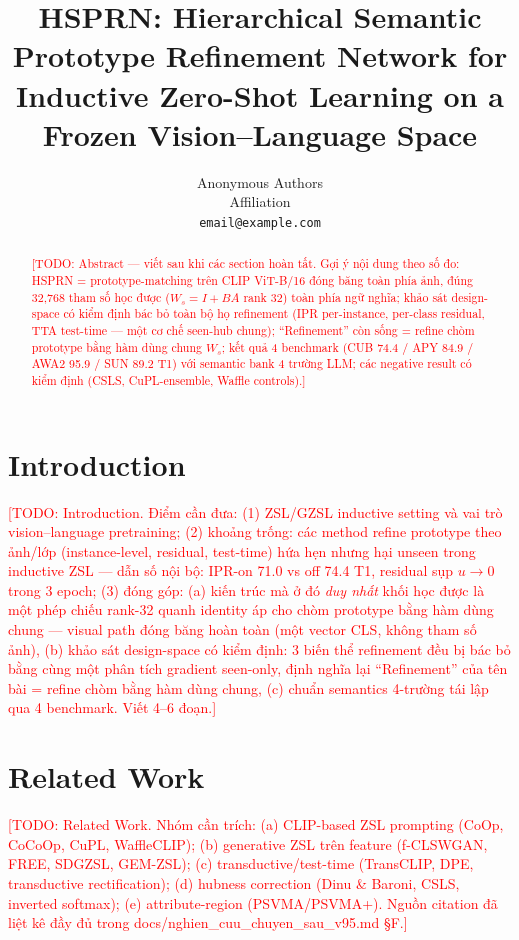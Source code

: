 \documentclass[10pt,twocolumn,letterpaper]{article}
\title{HSPRN: Hierarchical Semantic Prototype Refinement Network for\\
Inductive Zero-Shot Learning on a Frozen Vision--Language Space}
\author{
  Anonymous Authors\\
  \small Affiliation\\
  \small \texttt{email@example.com}
}
\date{}
\newcommand{\todo}[1]{\textcolor{red}{[TODO: #1]}}
\begin{document}
\maketitle

\begin{abstract}
\todo{Abstract — viết sau khi các section hoàn tất. Gợi ý nội dung theo số đo: HSPRN = prototype-matching trên CLIP ViT-B/16 đóng băng toàn phía ảnh, đúng 32{,}768 tham số học được ($W_s{=}I{+}BA$ rank 32) toàn phía ngữ nghĩa; khảo sát design-space có kiểm định bác bỏ toàn bộ họ refinement (IPR per-instance, per-class residual, TTA test-time — một cơ chế seen-hub chung); ``Refinement'' còn sống = refine chòm prototype bằng hàm dùng chung $W_s$; kết quả 4 benchmark (CUB 74.4 / APY 84.9 / AWA2 95.9 / SUN 89.2 T1) với semantic bank 4 trường LLM; các negative result có kiểm định (CSLS, CuPL-ensemble, Waffle controls).}
\end{abstract}

\section{Introduction}
\todo{Introduction. Điểm cần đưa: (1) ZSL/GZSL inductive setting và vai trò vision--language pretraining; (2) khoảng trống: các method refine prototype theo ảnh/lớp (instance-level, residual, test-time) hứa hẹn nhưng hại unseen trong inductive ZSL — dẫn số nội bộ: IPR-on 71.0 vs off 74.4 T1, residual sụp $u \to 0$ trong 3 epoch; (3) đóng góp: (a) kiến trúc mà ở đó \emph{duy nhất} khối học được là một phép chiếu rank-32 quanh identity áp cho chòm prototype bằng hàm dùng chung — visual path đóng băng hoàn toàn (một vector CLS, không tham số ảnh), (b) khảo sát design-space có kiểm định: 3 biến thể refinement đều bị bác bỏ bằng cùng một phân tích gradient seen-only, định nghĩa lại ``Refinement'' của tên bài = refine chòm bằng hàm dùng chung, (c) chuẩn semantics 4-trường tái lập qua 4 benchmark. Viết 4--6 đoạn.}

\section{Related Work}
\todo{Related Work. Nhóm cần trích: (a) CLIP-based ZSL prompting (CoOp, CoCoOp, CuPL, WaffleCLIP); (b) generative ZSL trên feature (f-CLSWGAN, FREE, SDGZSL, GEM-ZSL); (c) transductive/test-time (TransCLIP, DPE, transductive rectification); (d) hubness correction (Dinu \& Baroni, CSLS, inverted softmax); (e) attribute-region (PSVMA/PSVMA+). Nguồn citation đã liệt kê đầy đủ trong docs/nghien\_cuu\_chuyen\_sau\_v95.md §F.}
\end{document}
